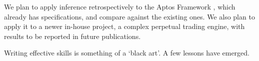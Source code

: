 \noindent We plan to apply inference retrospectively to the Aptos Framework \cite{AptosFrameworkBook}, which already has specifications, and compare against the existing ones.
We also plan to apply it to a newer in-house project, a complex perpetual trading engine, with results to be reported in future publications.

%



Writing effective skills is something of a `black art'. A few lessons have emerged.

